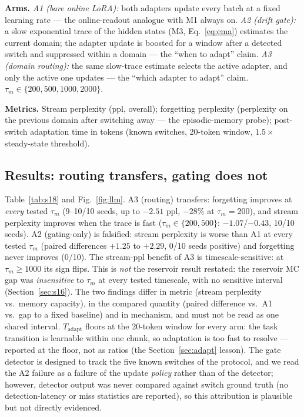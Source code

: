 \documentclass[preprint,12pt]{elsarticle}
\begin{document}
\textbf{Arms.} \emph{A1 (bare online LoRA):} both adapters update every
batch at a fixed learning rate --- the online-readout analogue with M1
always on. \emph{A2 (drift gate):} a slow exponential trace of the hidden
states (M3, Eq.~\ref{eq:ema}) estimates the current domain; the adapter
update is boosted for a window after a detected switch and suppressed
within a domain --- the ``when to adapt'' claim. \emph{A3 (domain
routing):} the same slow-trace estimate selects the active adapter, and
only the active one updates --- the ``which adapter to adapt'' claim.
$\tau_m\in\{200,500,1000,2000\}$.

\textbf{Metrics.} Stream perplexity (ppl, overall); forgetting perplexity
(perplexity on the previous domain after switching away --- the
episodic-memory probe); post-switch adaptation time in tokens (known
switches, 20-token window, $1.5\times$ steady-state threshold).

\subsection{Results: routing transfers, gating does not}

Table~\ref{tab:s18} and Fig.~\ref{fig:llm}. A3 (routing) transfers:
forgetting improves at \emph{every} tested $\tau_m$ (9--10/10 seeds, up to
$-2.51$ ppl, $-28\%$ at $\tau_m{=}200$), and stream perplexity improves
when the trace is fast ($\tau_m\in\{200,500\}$: $-1.07$/$-0.43$, 10/10
seeds). A2 (gating-only) is falsified: stream perplexity is worse than
A1 at every tested $\tau_m$ (paired differences $+1.25$ to $+2.29$, 0/10 seeds
positive) and forgetting never improves (0/10). The stream-ppl benefit
of A3 is timescale-sensitive: at $\tau_m\ge1000$ its sign flips. This is
\emph{not} the reservoir result restated: the reservoir MC gap was
\emph{insensitive} to $\tau_m$ at every tested timescale, with no
sensitive interval (Section~\ref{sec:s16}). The two findings differ in
metric (stream perplexity vs.\ memory capacity), in the compared
quantity (paired difference vs.\ A1 vs.\ gap to a fixed baseline) and in
mechanism, and must not be read as one shared interval. $T_{\mathrm{adapt}}$ floors at the 20-token
window for every arm: the task transition is learnable within one chunk,
so adaptation is too fast to resolve --- reported at the floor, not as
ratios (the Section~\ref{sec:adapt} lesson). The gate detector is
designed to track the five known switches of the protocol, and we read
the A2 failure as a failure of the update \emph{policy} rather than of
the detector; however, detector output was never compared against
switch ground truth (no detection-latency or miss statistics are
reported), so this attribution is plausible but not directly evidenced.
\end{document}

